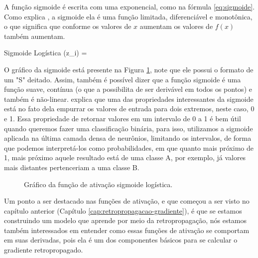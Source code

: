 A função sigmoide é escrita com uma exponencial, como na fórmula \ref{eq:sigmoide}. Como explica \textcite{ActivationFunctionsLederer}, a sigmoide ela é uma função limitada, diferenciável e monotônica, o que significa que conforme os valores de $x$ aumentam os valores de $f(x)$ também aumentam.

\begin{equacaodestaque}{Sigmoide Logística}
    \sigma(z_i) = 
    \label{eq:sigmoide}
\end{equacaodestaque}

O gráfico da sigmoide está presente na Figura \ref{fig:sigmoide}, note que ele possui o formato de um "S" deitado. Assim, também é possível dizer que a função sigmoide é uma função suave, contínua (o que a possibilita de ser derivável em todos os pontos) e também é não-linear. \textcite{ActivationFunctionsLederer} explica que uma das propriedades interessantes da sigmoide está no fato dela empurrar os valores de entrada para dois extremos, neste caso, 0 e 1. Essa propriedade de retornar valores em um intervalo de 0 a 1 é bem útil quando queremos fazer uma classificação binária, para isso, utilizamos a sigmoide aplicada na última camada densa de neurônios, limitando os intervalos, de forma que podemos interpretá-los como probabilidades, em que quanto mais próximo de 1, mais próximo aquele resultado está de uma classe A, por exemplo, já valores mais distantes pertenceriam a uma classe B.

\begin{figure}[h!]
    \centering
    \caption{Gráfico da função de ativação sigmoide logística.}
    \label{fig:sigmoide}
\end{figure}

Um ponto a ser destacado nas funções de ativação, e que começou a ser visto no capítulo anterior (Capítulo \ref{cap:retropropagacao-gradiente}), é que se estamos construindo um modelo que aprende por meio da retropropagação, nós estamos também interessados em entender como essas funções de ativação se comportam em suas derivadas, pois ela é um dos componentes básicos para se calcular o gradiente retropropagado.

